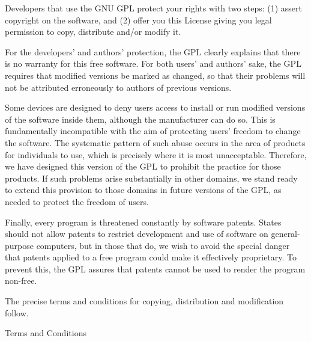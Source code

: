 \documentclass[12pt,a4paper]{book}
\begin{document}
Developers that use the GNU GPL protect your rights with two steps:
(1) assert copyright on the software, and (2) offer you this License
giving you legal permission to copy, distribute and/or modify it.

For the developers' and authors' protection, the GPL clearly explains
that there is no warranty for this free software.  For both users' and
authors' sake, the GPL requires that modified versions be marked as
changed, so that their problems will not be attributed erroneously to
authors of previous versions.

Some devices are designed to deny users access to install or run
modified versions of the software inside them, although the manufacturer
can do so.  This is fundamentally incompatible with the aim of
protecting users' freedom to change the software.  The systematic
pattern of such abuse occurs in the area of products for individuals to
use, which is precisely where it is most unacceptable.  Therefore, we
have designed this version of the GPL to prohibit the practice for those
products.  If such problems arise substantially in other domains, we
stand ready to extend this provision to those domains in future versions
of the GPL, as needed to protect the freedom of users.

Finally, every program is threatened constantly by software patents.
States should not allow patents to restrict development and use of
software on general-purpose computers, but in those that do, we wish to
avoid the special danger that patents applied to a free program could
make it effectively proprietary.  To prevent this, the GPL assures that
patents cannot be used to render the program non-free.

The precise terms and conditions for copying, distribution and
modification follow.


\begin{center}
{\Large \sc Terms and Conditions}
\end{center}
\end{document}
